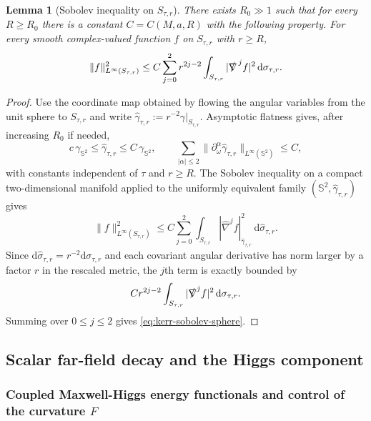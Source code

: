 \documentclass[11pt]{article}
\numberwithin{equation}{section}
\theoremstyle{plain}
\newtheorem{lemma}[theorem]{Lemma}
\theoremstyle{definition}
\theoremstyle{remark}
\newcommand{\dd}{\mathrm{d}}
\begin{document}
\begin{lemma}[Sobolev inequality on $S_{\tau,r}$]\label{lem:kerr-sobolev-sphere}
There exists $R_{0}\gg1$ such that for every $R\ge R_{0}$ there is a constant $C=C(M,a,R)$ with the following property.
For every smooth complex-valued function $f$ on $S_{\tau,r}$ with $r\ge R$,
\begin{equation}\label{eq:kerr-sobolev-sphere}
\|f\|_{L^{\infty}(S_{\tau,r})}^{2}
\le
C\sum_{j=0}^{2} r^{2j-2}\int_{S_{\tau,r}}|\slashed{\nabla}^{\,j}f|^{2}\,\dd\sigma_{\tau,r}.
\end{equation}
\end{lemma}

\begin{proof}
Use the coordinate map obtained by flowing the angular variables from the unit sphere to $S_{\tau,r}$ and write $\widehat \gamma_{\tau,r}:=r^{-2}\gamma|_{S_{\tau,r}}$.  Asymptotic flatness gives, after increasing $R_{0}$ if needed,
\begin{equation*}
 c\,\gamma_{\mathbb S^{2}}\le \widehat \gamma_{\tau,r}\le C\,\gamma_{\mathbb S^{2}},
 \qquad
 \sum_{|\alpha|\le2}\|\partial_\omega^\alpha \widehat\gamma_{\tau,r}\|_{L^{\infty}(\mathbb S^2)}\le C,
\end{equation*}
with constants independent of $\tau$ and $r\ge R$.  The Sobolev inequality on a compact two-dimensional manifold applied to the uniformly equivalent family $(\mathbb S^2,\widehat\gamma_{\tau,r})$ gives
\begin{equation*}
 \|f\|_{L^\infty(S_{\tau,r})}^{2}
 \le C\sum_{j=0}^{2}\int_{S_{\tau,r}}|\widehat\nabla^{j}f|_{\widehat\gamma_{\tau,r}}^{2}\,\dd\widehat\sigma_{\tau,r}.
\end{equation*}
Since $\dd\widehat\sigma_{\tau,r}=r^{-2}\dd\sigma_{\tau,r}$ and each covariant angular derivative has norm larger by a factor $r$ in the rescaled metric, the $j$th term is exactly bounded by
\begin{equation*}
 C r^{2j-2}\int_{S_{\tau,r}}|\slashed\nabla^{j}f|^{2}\,\dd\sigma_{\tau,r}.
\end{equation*}
Summing over $0\le j\le2$ gives \eqref{eq:kerr-sobolev-sphere}.
\end{proof}

\subsection{Scalar far-field decay and the Higgs component}\label{subsec:kerr-far-scalar}

\subsubsection*{Coupled Maxwell-Higgs energy functionals and control of the curvature $F$}\label{subsubsec:kerr-far-mh-energy}
\end{document}
